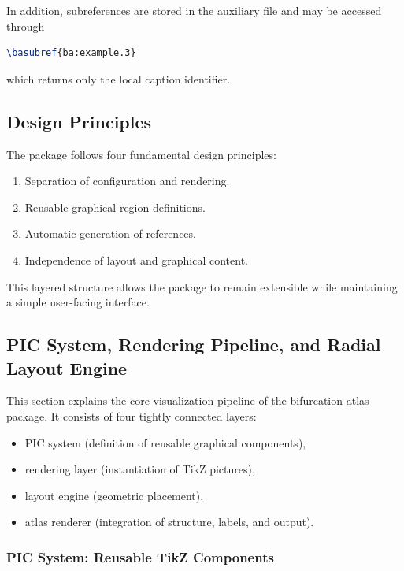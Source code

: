 In addition, subreferences are stored in the auxiliary file and may be accessed through

\begin{lstlisting}[language=LaTeX]
\basubref{ba:example.3}
\end{lstlisting}

which returns only the local caption identifier.

\subsection{Design Principles}

The package follows four fundamental design principles:

\begin{enumerate}
\item Separation of configuration and rendering.
\item Reusable graphical region definitions.
\item Automatic generation of references.
\item Independence of layout and graphical content.
\end{enumerate}

This layered structure allows the package to remain extensible while maintaining a simple user-facing interface.

\subsection{PIC System, Rendering Pipeline, and Radial Layout Engine}

This section explains the core visualization pipeline of the bifurcation atlas package. It consists of four tightly connected layers:

\begin{itemize}
\item PIC system (definition of reusable graphical components),
\item rendering layer (instantiation of TikZ pictures),
\item layout engine (geometric placement),
\item atlas renderer (integration of structure, labels, and output).
\end{itemize}

\subsubsection{PIC System: Reusable TikZ Components}


